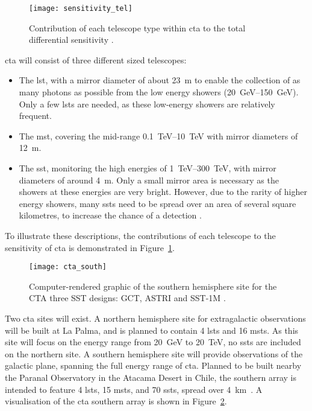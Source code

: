 \begin{figure}
	\centering\texttt{[image: sensitivity\_tel]} 
	\caption[Differential sensitivity of the different CTA telescope types.]{Contribution of each telescope type within \gls{cta} to the total differential sensitivity \cite{Marano2014}.}
	\label{fig:sensitivity_tel}
\end{figure}

\gls{cta} will consist of three different sized telescopes:
\begin{itemize}
\item The \gls{lst}, with a mirror diameter of about \SI{23}{m} to enable the collection of as many photons as possible from the low energy showers (\SIrange{20}{150}{GeV}). Only a few \glspl{lst} are needed, as these low-energy showers are relatively frequent.
\item The \gls{mst}, covering the mid-range \SIrange{0.1}{10}{TeV} with mirror diameters of \SI{12}{m}.
\item The \gls{sst}, monitoring the high energies of \SIrange{1}{300}{TeV}, with mirror diameters of around \SI{4}{m}. Only a small mirror area is necessary as the showers at these energies are very bright. However, due to the rarity of higher energy showers, many \glspl{sst} need to be spread over an area of several square kilometres, to increase the chance of a detection \cite{Acharya2013}.
\end{itemize}
To illustrate these descriptions, the contributions of each telescope to the sensitivity of \gls{cta} is demonstrated in Figure~\ref{fig:sensitivity_tel}.

\begin{figure}
	\centering\texttt{[image: cta\_south]} 
	\caption[The southern-hemisphere Cherenkov Telescope Array.]{Computer-rendered graphic of the southern hemisphere site for the CTA three SST designs: GCT, ASTRI and SST-1M \cite{cta-sst}.}
	\label{fig:cta_south}
\end{figure}

Two \gls{cta} sites will exist. A northern hemisphere site for extragalactic observations will be built at La Palma, and is planned to contain 4 \glspl{lst} and 16 \glspl{mst}. As this site will focus on the energy range from \SI{20}{GeV} to \SI{20}{TeV}, no \glspl{sst} are included on the northern site. A southern hemisphere site will provide observations of the galactic plane, spanning the full energy range of \gls{cta}. Planned to be built nearby the Paranal Observatory in the Atacama Desert in Chile, the southern array is intended to feature 4 \glspl{lst}, 15 \glspl{mst}, and 70 \glspl{sst}, spread over \SI{4}{km \squared}. A visualisation of the \gls{cta} southern array is shown in Figure~\ref{fig:cta_south}.


